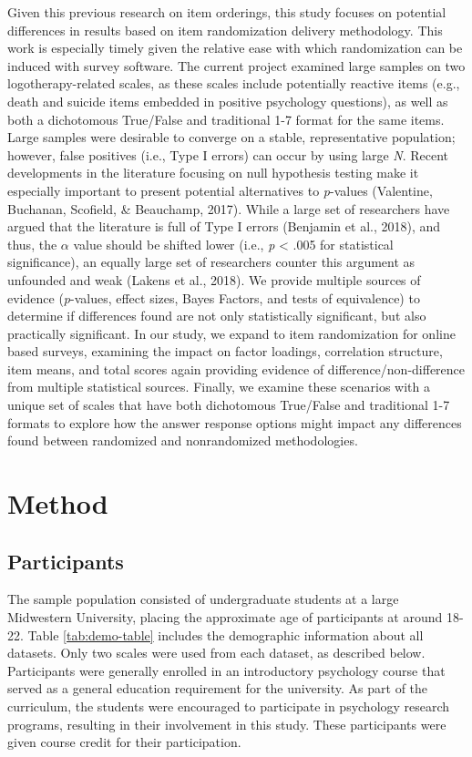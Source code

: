 \documentclass[english,man]{apa6}
\theoremstyle{definition}
\theoremstyle{definition}
\theoremstyle{definition}
\theoremstyle{remark}
\begin{document}
Given this previous research on item orderings, this study focuses on
potential differences in results based on item randomization delivery
methodology. This work is especially timely given the relative ease with
which randomization can be induced with survey software. The current
project examined large samples on two logotherapy-related scales, as
these scales include potentially reactive items (e.g., death and suicide
items embedded in positive psychology questions), as well as both a
dichotomous True/False and traditional 1-7 format for the same items.
Large samples were desirable to converge on a stable, representative
population; however, false positives (i.e., Type I errors) can occur by
using large \emph{N}. Recent developments in the literature focusing on
null hypothesis testing make it especially important to present
potential alternatives to \emph{p}-values (Valentine, Buchanan,
Scofield, \& Beauchamp, 2017). While a large set of researchers have
argued that the literature is full of Type I errors (Benjamin et al.,
2018), and thus, the \(\alpha\) value should be shifted lower (i.e.,
\emph{p} \textless{} .005 for statistical significance), an equally
large set of researchers counter this argument as unfounded and weak
(Lakens et al., 2018). We provide multiple sources of evidence
(\emph{p}-values, effect sizes, Bayes Factors, and tests of equivalence)
to determine if differences found are not only statistically
significant, but also practically significant. In our study, we expand
to item randomization for online based surveys, examining the impact on
factor loadings, correlation structure, item means, and total scores
again providing evidence of difference/non-difference from multiple
statistical sources. Finally, we examine these scenarios with a unique
set of scales that have both dichotomous True/False and traditional 1-7
formats to explore how the answer response options might impact any
differences found between randomized and nonrandomized methodologies.

\section{Method}\label{method}

\subsection{Participants}\label{participants}

The sample population consisted of undergraduate students at a large
Midwestern University, placing the approximate age of participants at
around 18-22. Table \ref{tab:demo-table} includes the demographic
information about all datasets. Only two scales were used from each
dataset, as described below. Participants were generally enrolled in an
introductory psychology course that served as a general education
requirement for the university. As part of the curriculum, the students
were encouraged to participate in psychology research programs,
resulting in their involvement in this study. These participants were
given course credit for their participation.
\end{document}
